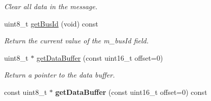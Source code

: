 \begin{DoxyCompactItemize}
\begin{DoxyCompactList}\small\item\em \-Clear all data in the message. \end{DoxyCompactList}\item 
\hypertarget{classxsens_1_1Message_ad09d2d2a7548aa3b066bcd1edcf32472}{uint8\-\_\-t \hyperlink{classxsens_1_1Message_ad09d2d2a7548aa3b066bcd1edcf32472}{get\-Bus\-Id} (void) const }\label{classxsens_1_1Message_ad09d2d2a7548aa3b066bcd1edcf32472}

\begin{DoxyCompactList}\small\item\em \-Return the current value of the m\-\_\-bus\-Id field. \end{DoxyCompactList}\item 
uint8\-\_\-t $\ast$ \hyperlink{classxsens_1_1Message_a34fd9380038c455bc40e486a06ac4dc2}{get\-Data\-Buffer} (const uint16\-\_\-t offset=0)
\begin{DoxyCompactList}\small\item\em \-Return a pointer to the data buffer. \end{DoxyCompactList}\item 
\hypertarget{classxsens_1_1Message_a745fc5145a77be5180733de402d0e22f}{const uint8\-\_\-t $\ast$ {\bfseries get\-Data\-Buffer} (const uint16\-\_\-t offset=0) const }\label{classxsens_1_1Message_a745fc5145a77be5180733de402d0e22f}


\end{DoxyCompactItemize}
